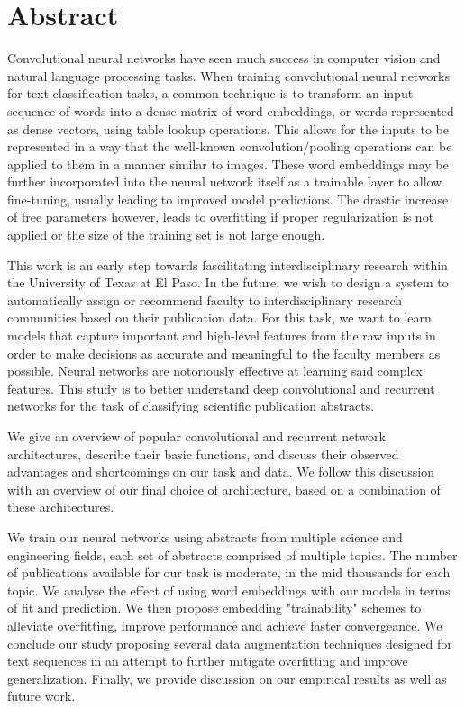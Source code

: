 

\chapter*{Abstract}
Convolutional neural networks have seen much success in computer vision and natural language processing tasks.
When training convolutional neural networks for text classification tasks, a common technique is to transform an input
sequence of words into a dense matrix of word embeddings, or words represented as dense vectors, using table lookup
operations. This allows for the inputs to be represented in a way that the well-known convolution/pooling operations can be applied
to them in a manner similar to images. These word embeddings may be further incorporated into the neural
network itself as a trainable layer to allow fine-tuning, usually leading to improved model predictions.
The drastic increase of free parameters however, leads to overfitting if proper regularization is not applied or the size of
the training set is not large enough.

This work is an early step towards fascilitating interdisciplinary research within the University of Texas at El Paso.
In the future, we wish to design a system to automatically assign or recommend faculty to
interdisciplinary research communities based on their publication data. For this task, we want to learn models that capture
important and high-level features from the raw inputs in order to make decisions as accurate and meaningful to the faculty members as possible.
Neural networks are notoriously effective at learning said complex features. This study is to better understand
deep convolutional and recurrent networks for the task of classifying scientific publication abstracts.

We give an overview of popular convolutional and recurrent network architectures, describe their basic functions, and discuss their
observed advantages and shortcomings on our task and data. We follow this discussion with an overview of our final choice of architecture,
based on a combination of these architectures.

We train our neural networks using abstracts from multiple science and engineering fields, each set of
abstracts comprised of multiple topics. The number of publications available for our task is moderate, in the mid thousands for each topic.
We analyse the effect of using word embeddings with our models in terms of fit and prediction. We then propose embedding "trainability" schemes
to alleviate overfitting, improve performance and achieve faster convergeance. We conclude our study proposing several data augmentation
techniques designed for text sequences in an attempt to further mitigate overfitting and improve generalization.
Finally, we provide discussion on our empirical results as well as future work.
